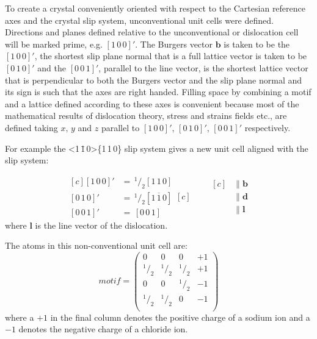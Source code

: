 To create a crystal conveniently oriented with respect to the Cartesian reference axes and the crystal slip system, unconventional unit cells were defined. Directions and planes defined relative to the unconventional or dislocation cell will be marked prime, e.g. $[1\,0\,0]'$. The Burgers vector $\mathbf{b}$ is taken to be the $[1\,0\,0]'$, the shortest slip plane normal that is a full lattice vector is taken to be $[0\,1\,0]'$ and the $[0\,0\,1]'$, parallel to the line vector, is the shortest lattice vector that is perpendicular to both the Burgers vector and the slip plane normal and its sign is such that the axes are right handed. Filling space by combining a motif and a lattice defined according to these axes is convenient because most of the mathematical results of dislocation theory, stress and strains fields etc., are defined taking $x$, $y$ and $z$ parallel to $[1\,0\,0]'$, $[0\,1\,0]'$, $[0\,0\,1]'$ respectively.

For example the  <1\,\={1}\,0>\{1\,1\,0\} slip system gives a new unit cell aligned with the slip system:

\begin{equation*}
\begin{aligned}[c]
{[1\,0\,0]}' &=\, ^{1}\!/_{2} [1\,1\,0]   \\
{[0\,1\,0]}' &=\, ^{1}\!/_{2} [1\,\overline{1}\,0]   \\
{[0\,0\,1]}' &=\, [0\,0\,1]   
\end{aligned}[c]
\qquad
\begin{aligned}[c]
&\parallel \mathbf{b} \\
&\parallel \mathbf{d} \\
&\parallel \mathbf{l}
\end{aligned}
\end{equation*}
where $\mathbf{l}$ is the line vector of the dislocation.


The atoms in this non-conventional unit cell are:
$$
motif = \begin{pmatrix}
0 & 0 & 0 & +1 \\
^{1}\!/_{2} & ^{1}\!/_{2} & ^{1}\!/_{2} & +1 \\
0 & 0 & ^{1}\!/_{2} & -1 \\
^{1}\!/_{2} & ^{1}\!/_{2} & 0 & -1 \\
\end{pmatrix}
$$
where a $+1$ in the final column denotes the positive charge of a sodium ion and a $-1$ denotes the negative charge of a chloride ion.



